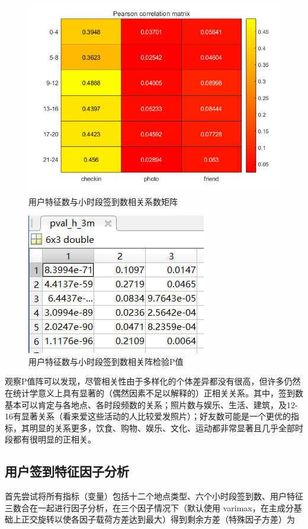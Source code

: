 \documentclass[UTF8]{ctexart}
\begin{document}
		\begin{figure}[H]
			\centering
			\includegraphics[scale=0.6]{cor_cpf_hour.png}
			\caption{用户特征数与小时段签到数相关系数矩阵}
			\label{cor_cpf_hour}
		\end{figure}
		\begin{figure}[H]
			\centering
			\includegraphics[scale=0.8]{pval_hour.png}
			\caption{用户特征数与小时段签到数相关阵检验P值}
			\label{pval_hour}
		\end{figure}
		
		观察P值阵可以发现，尽管相关性由于多样化的个体差异都没有很高，但许多仍然在统计学意义上具有显著的（偶然因素不足以解释的）正相关关系。其中，签到数基本可以肯定与各地点、各时段频数的关系；照片数与娱乐、生活、建筑，及12-16有显著关系（看来爱这些活动的人比较爱发照片）；好友数可能是一个更优的指标，其明显的关系更多，饮食、购物、娱乐、文化、运动都非常显著且几乎全部时段都有很明显的正相关。
		
		\subsection{用户签到特征因子分析}
		首先尝试将所有指标（变量）包括十二个地点类型、六个小时段签到数、用户特征三数合在一起进行因子分析，在三个因子情况下（默认使用 varimax，在主成分基础上正交旋转以使各因子载荷方差达到最大）得到剩余方差（特殊因子方差）为
		
\end{document}
